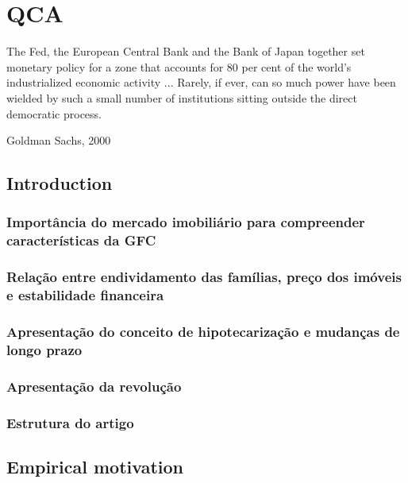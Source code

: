 \documentclass[12pt,openright,oneside,a4paper,english,sumario=tradicional]{gpsabntex}
\numberwithin{listing}{chapter}
\begin{document}
\tableofcontents*
\thispagestyle{empty}

\mainmatter
\cleardoublepage
\pagestyle{plain} %
\renewcommand{\thepage}{\arabic{page}}  %


\chapter{QCA}
\label{sec:org7d6e719}

\epigraph{The Fed, the European Central Bank and the Bank of Japan together set monetary policy for a zone that accounts for 80 per cent of the world’s
industrialized economic activity ... Rarely, if ever, can so much power have been wielded by such a small number of institutions sitting outside the
direct democratic process.}{Goldman Sachs, 2000}


\section{Introduction}
\label{sec:org102f394}
\subsection{Importância do mercado imobiliário para compreender características da GFC}
\label{sec:orgda04412}
\subsection{Relação entre endividamento das famílias, preço dos imóveis e estabilidade financeira}
\label{sec:org05cbb8f}
\subsection{Apresentação do conceito de hipotecarização e mudanças de longo prazo}
\label{sec:org84fdfb0}
\subsection{Apresentação da revolução}
\label{sec:org9ff92df}
\subsection{Estrutura do artigo}
\label{sec:orgb6563cf}

\section{Empirical motivation}
\label{sec:org315cf4a}
\end{document}
